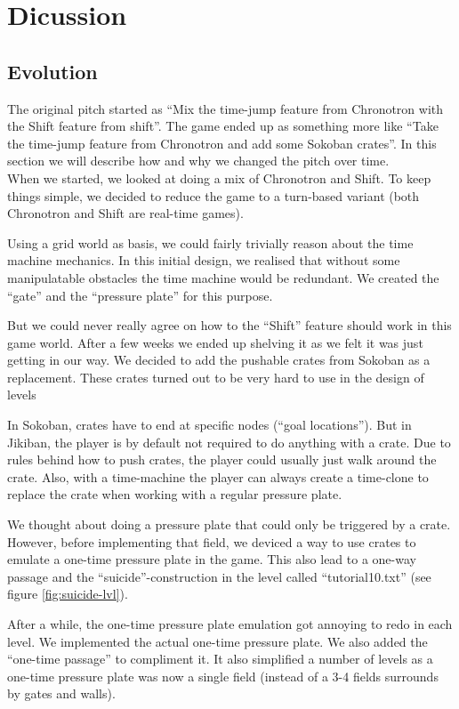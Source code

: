 \section{Dicussion}

\subsection{Evolution}
The original pitch started as ``Mix the time-jump feature from
Chronotron with the Shift feature from shift''.  The game ended up as
something more like ``Take the time-jump feature from Chronotron and
add some Sokoban crates''.  In this section we will describe how and why
we changed the pitch over time.\\


When we started, we looked at doing a mix of Chronotron and Shift.  To
keep things simple, we decided to reduce the game to a turn-based
variant (both Chronotron and Shift are real-time games).

Using a grid world as basis, we could fairly trivially reason about
the time machine mechanics.  In this initial design, we realised that
without some manipulatable obstacles the time machine would be
redundant.  We created the ``gate'' and the ``pressure plate'' for
this purpose.

But we could never really agree on how to the ``Shift'' feature should
work in this game world.  After a few weeks we ended up shelving it as
we felt it was just getting in our way.  We decided to add the
pushable crates from Sokoban as a replacement.  These crates turned out
to be very hard to use in the design of levels

In Sokoban, crates have to end at specific nodes (``goal locations'').
But in Jikiban, the player is by default not required to do anything
with a crate.  Due to rules behind how to push crates, the player
could usually just walk around the crate.  Also, with a time-machine
the player can always create a time-clone to replace the crate when
working with a regular pressure plate.

We thought about doing a pressure plate that could only be triggered
by a crate.  However, before implementing that field, we deviced a way
to use crates to emulate a one-time pressure plate in the game.  This
also lead to a one-way passage and the ``suicide''-construction in the
level called ``tutorial10.txt'' (see figure \ref{fig:suicide-lvl}).

After a while, the one-time pressure plate emulation got annoying to
redo in each level.  We implemented the actual one-time pressure
plate. We also added the ``one-time passage'' to compliment it.  It
also simplified a number of levels as a one-time pressure plate was
now a single field (instead of a 3-4 fields surrounds by gates and
walls).

